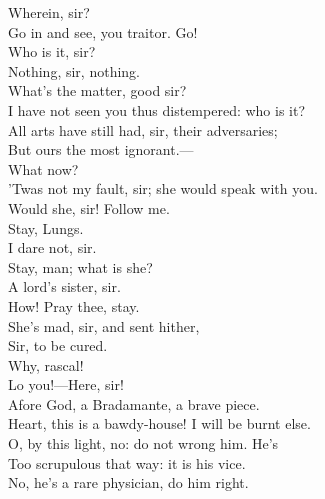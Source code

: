 \documentclass[a4paper,oneside,12pt]{memoir}
\begin{document}
\begin{drama*}
\facespeaks {} Wherein, sir?\\
\subtlespeaks Go in and see, you traitor. Go!\\
\mammonspeaks {} Who is it, sir?\\
\subtlespeaks Nothing, sir, nothing.\\
\mammonspeaks {} What's the matter, good sir?\\
I have not seen you thus distempered: who is it?\\
\subtlespeaks All arts have still had, sir, their adversaries;\\
But ours the most ignorant.---\\
 What now?\\
\facespeaks 'Twas not my fault, sir; she would speak with you.\\
\subtlespeaks Would she, sir! Follow me.\\
\mammonspeaks {} Stay, Lungs.\\
\facespeaks {} I dare not, sir.\\
\mammonspeaks Stay, man; what is she?\\
\facespeaks {} A lord's sister, sir.\\
\mammonspeaks How! Pray thee, stay.\\
\facespeaks {} She's mad, sir, and sent hither,\\
Sir, to be cured.\\
\subtlespeaks {}  Why, rascal!\\
\facespeaks {} Lo you!---Here, sir!\\
\mammonspeaks Afore God, a Bradamante, a brave piece.\\
\surlyspeaks Heart, this is a bawdy-house! I will be burnt else.\\
\mammonspeaks O, by this light, no: do not wrong him. He's\\
Too scrupulous that way: it is his vice.\\
No, he's a rare physician, do him right.\\

\end{drama*}
\end{document}
